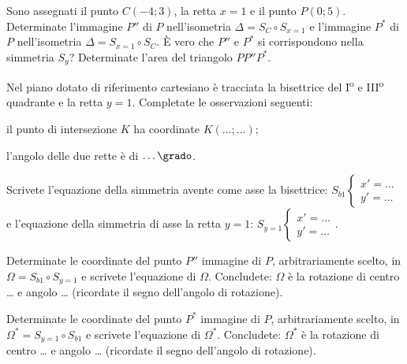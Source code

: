 \begin{esercizio}
	\label{ese:8.65} %
	Sono assegnati il punto $C(-4;3)$, la retta $x=1$ e il punto 
	$P(0;5)$. Determinate l'immagine $P''$ di $P$ nell'isometria 
	$\Delta=S_{C}\circ S_{x=1}$ e l'immagine $P^*$ di $P$ nell'isometria 
	$\Delta=S_{x=1}\circ S_{C}$. \`E vero che $P''$ e $P^*$ si 
	corrispondono nella simmetria $S_y$? Determinate l'area del triangolo 
	$PP''P^*$.
\end{esercizio}

\begin{esercizio}
	\label{ese:8.69} %
	Nel piano dotato di riferimento cartesiano è tracciata la bisettrice 
	del I\textsuperscript{o} e III\textsuperscript{o} quadrante e la 
	retta $y=1$. Completate le osservazioni seguenti:
	\begin{enumeratea}
		\item il punto di intersezione $K$ ha coordinate 
		$K(\ldots{};\ldots{})$;
		\item l'angolo delle due rette è di $\ldots{}\grado$.
	\end{enumeratea}
\end{esercizio}

\begin{esercizio}
	\label{ese:8.70} %
	Scrivete l'equazione della simmetria avente come asse la bisettrice: 
	$S_{b1}\begin{cases}x'=\ldots{}\\y'=\ldots{}\end{cases}$ e 
	l'equazione della simmetria di asse la retta $y=1$: 
	$S_{y=1}\begin{cases}x'=\ldots{}\\y'=\ldots{}\end{cases}$.
\end{esercizio}

\begin{esercizio}
	\label{ese:8.71} %
	Determinate le coordinate del punto $P''$ immagine di $P$, 
	arbitrariamente scelto, in $\Omega = S_{b1} \circ S_{y=1}$ e scrivete 
	l'equazione di $\Omega$.
	Concludete: $\Omega$ è la rotazione di centro \ldots{} e angolo 
	\ldots{} (ricordate il segno dell'angolo di rotazione).
\end{esercizio}

\begin{esercizio}
	\label{ese:8.72} %
	Determinate le coordinate del punto $P^*$ immagine di $P$, 
	arbitrariamente scelto, in $\Omega^*=S_{y=1} \circ S_{b1}$ e scrivete 
	l'equazione di $\Omega^*$.
	Concludete: $\Omega^*$ è la rotazione di centro \ldots{} e angolo 
	\ldots{} (ricordate il segno dell'angolo di rotazione).
\end{esercizio}

